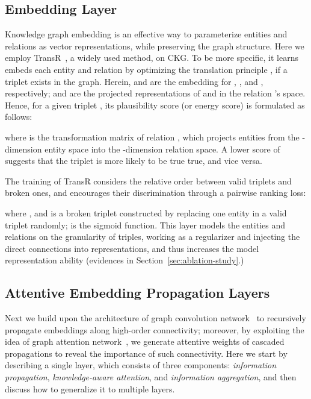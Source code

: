 \documentclass[sigconf]{acmart}
\theoremstyle{definition}
\begin{document}
\subsection{Embedding Layer}\label{sec:embedding-propagation}

Knowledge graph embedding is an effective way to parameterize entities and relations as vector representations, while preserving the graph structure.
Here we employ TransR~\cite{TransR}, a widely used method, on CKG.
To be more specific, it learns embeds each entity and relation by optimizing the translation principle , if a triplet  exists in the graph.
Herein,  and  are the embedding for , , and , respectively;
and  are the projected representations of  and  in the relation 's space. 
Hence, for a given triplet , its plausibility score (or energy score) is formulated as follows:

where  is the transformation matrix of relation , which projects entities from the -dimension entity space into the -dimension relation space.
A lower score of  suggests that the triplet is more likely to be true true, and vice versa.

The training of TransR considers the relative order between valid triplets and broken ones, and encourages their discrimination through a pairwise ranking loss:

where , and  is a broken triplet constructed by replacing one entity in a valid triplet randomly;  is the sigmoid function.
This layer models the entities and relations on the granularity of triples, working as a regularizer and injecting the direct connections into representations, and thus increases the model representation ability (evidences in Section~\ref{sec:ablation-study}.)

\subsection{Attentive Embedding Propagation Layers}
Next we build upon the architecture of graph convolution network~\cite{GCN} to recursively propagate embeddings along high-order connectivity;
moreover, by exploiting the idea of graph attention network~\cite{GAT}, we generate attentive weights of cascaded propagations to reveal the importance of such connectivity.
Here we start by describing a single layer, which consists of three components: \emph{information propagation}, \emph{knowledge-aware attention}, and \emph{information aggregation}, and then discuss how to generalize it to multiple layers.
\end{document}
